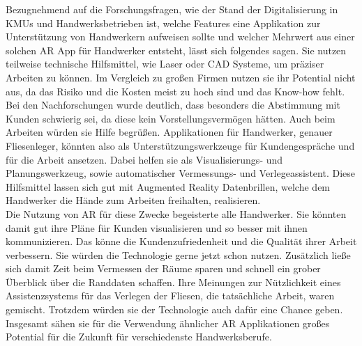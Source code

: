 Bezugnehmend auf die Forschungsfragen, wie der Stand der Digitalisierung in KMUs und Handwerksbetrieben ist, welche Features eine Applikation zur Unterstützung von Handwerkern aufweisen sollte und welcher Mehrwert aus einer solchen AR App für Handwerker entsteht, lässt sich folgendes sagen. Sie nutzen teilweise technische Hilfsmittel, wie Laser oder CAD Systeme, um präziser Arbeiten zu können. Im Vergleich zu großen Firmen nutzen sie ihr Potential nicht aus, da das Risiko und die Kosten meist zu hoch sind und das Know-how fehlt. \\
Bei den Nachforschungen wurde deutlich, dass besonders die Abstimmung mit Kunden schwierig sei, da diese kein Vorstellungsvermögen hätten. Auch beim Arbeiten würden sie Hilfe begrüßen. Applikationen für Handwerker, genauer Fliesenleger, könnten also als Unterstützungswerkzeuge für Kundengespräche und für die Arbeit ansetzen. Dabei helfen sie als Visualisierungs- und Planungswerkzeug, sowie automatischer Vermessungs- und Verlegeassistent. Diese Hilfsmittel lassen sich gut mit Augmented Reality Datenbrillen, welche dem Handwerker die Hände zum Arbeiten freihalten, realisieren. \\
Die Nutzung von AR für diese Zwecke begeisterte alle Handwerker. Sie könnten damit gut ihre Pläne für Kunden visualisieren und so besser mit ihnen kommunizieren. Das könne die Kundenzufriedenheit und die Qualität ihrer Arbeit verbessern. Sie würden die Technologie gerne jetzt schon nutzen. Zusätzlich ließe sich damit Zeit beim Vermessen der Räume sparen und schnell ein grober Überblick über die Randdaten schaffen. Ihre Meinungen zur Nützlichkeit eines Assistenzsystems für das Verlegen der Fliesen, die tatsächliche Arbeit, waren gemischt. Trotzdem würden sie der Technologie auch dafür eine Chance geben. Insgesamt sähen sie für die Verwendung ähnlicher AR Applikationen großes Potential für die Zukunft für verschiedenste Handwerksberufe.

